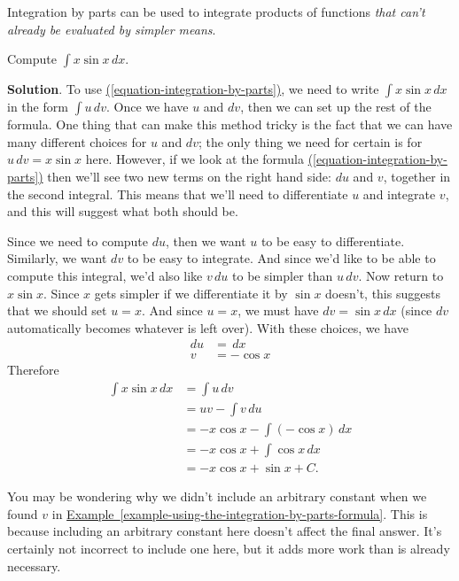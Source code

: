 \documentclass[10pt,]{book}
\theoremstyle{ptxplainnotitle}
\theoremstyle{ptxplaintitle}
\theoremstyle{ptxplainnotitle}
\theoremstyle{ptxplaintitle}
\theoremstyle{ptxplainnotitle}
\theoremstyle{ptxplaintitle}
\theoremstyle{ptxdefinitionnotitle}
\theoremstyle{ptxdefinitiontitle}
\theoremstyle{ptxdefinitionnotitle}
\theoremstyle{ptxdefinitiontitle}
\theoremstyle{ptxdefinitionnotitle}
\theoremstyle{ptxdefinitiontitle}
\theoremstyle{ptxdefinitionnotitle}
\theoremstyle{ptxdefinitiontitle}
\theoremstyle{ptxdefinitionnotitle}
\theoremstyle{ptxdefinitiontitle}
\numberwithin{equation}{section}
\begin{document}
Integration by parts can be used to integrate products of functions \emph{that can't already be evaluated by simpler means}.%
\begin{example}\label{example-using-the-integration-by-parts-formula}
\hypertarget{p-500}{}%
Compute \(\int x\sin x\,dx\).%
\par\smallskip%
\noindent\textbf{Solution}.\hypertarget{solution-110}{}\quad%
\hypertarget{p-501}{}%
To use \hyperref[equation-integration-by-parts]{(\ref{equation-integration-by-parts})}, we need to write \(\int x\sin x\,dx\) in the form \(\int u\,dv\). Once we have \(u\) and \(dv\), then we can set up the rest of the formula. One thing that can make this method tricky is the fact that we can have many different choices for \(u\) and \(dv\); the only thing we need for certain is for \(u\,dv = x\sin x\) here. However, if we look at the formula \hyperref[equation-integration-by-parts]{(\ref{equation-integration-by-parts})} then we'll see two new terms on the right hand side: \(du\) and \(v\), together in the second integral. This means that we'll need to differentiate \(u\) and integrate \(v\), and this will suggest what both should be.%
\par
\hypertarget{p-502}{}%
Since we need to compute \(du\), then we want \(u\) to be easy to differentiate. Similarly, we want \(dv\) to be easy to integrate. And since we'd like to be able to compute this integral, we'd also like \(v\,du\) to be simpler than \(u\,dv\). Now return to \(x\sin x\). Since \(x\) gets simpler if we differentiate it by \(\sin x\) doesn't, this suggests that we should set \(u = x\). And since \(u = x\), we must have \(dv = \sin x\,dx\) (since \(dv\) automatically becomes whatever is left over). With these choices, we have%
%
\begin{align*}
du & = \,dx \\
v & = -\cos x 
\end{align*}
\hypertarget{p-503}{}%
Therefore%
%
\begin{align*}
\int x\sin x\,dx & = \int u\,dv \\
& = uv - \int v\,du \\
& = -x\cos x - \int (-\cos x)\,dx \\
& = -x\cos x + \int\cos x\,dx \\
& = -x\cos x + \sin x + C. 
\end{align*}
\end{example}
\begin{aside}{}\label{aside-9}
\hypertarget{p-504}{}%
You may be wondering why we didn't include an arbitrary constant when we found \(v\) in \hyperref[example-using-the-integration-by-parts-formula]{Example~\ref{example-using-the-integration-by-parts-formula}}. This is because including an arbitrary constant here doesn't affect the final answer. It's certainly not incorrect to include one here, but it adds more work than is already necessary.%
\end{aside}
\end{document}
